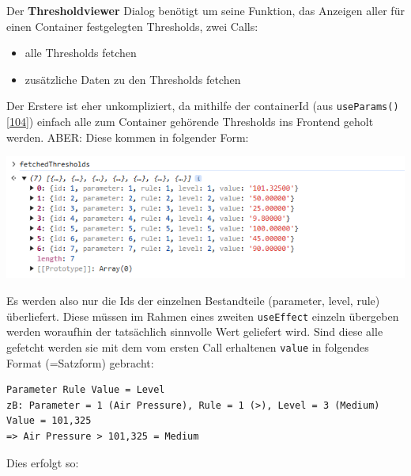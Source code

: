 \documentclass[
    headings=optiontotocandhead,%
    twoside,
    numbers=noenddot,%
    12pt, %
    titlepage, %
    parskip=full, %
    listof=leveldown, 
    numbers=noenddot, %
    a4paper,DIV=14,
    BCOR=15mm,
]{scrbook}
\newcommand{\passthrough}[1]{#1}
\let\origfigure=\figure
\let\endorigfigure=\endfigure
\renewenvironment{figure}[1][]{%
   \origfigure[H]
}{%
   \endorigfigure
}
\providecommand{\tightlist}{%
  \setlength{\itemsep}{0pt}\setlength{\parskip}{0pt}}
\begin{document}
Der \textbf{Thresholdviewer} Dialog benötigt um seine Funktion, das
Anzeigen aller für einen Container festgelegten Thresholds, zwei Calls:

\begin{itemize}
\tightlist
\item
  alle Thresholds fetchen
\item
  zusätzliche Daten zu den Thresholds fetchen
\end{itemize}

Der Erstere ist eher unkompliziert, da mithilfe der containerId (aus
\passthrough{\lstinline!useParams()!}
{[}\protect\hyperlink{ref-Refine-ReactRouter}{104}{]}) einfach alle zum
Container gehörende Thresholds ins Frontend geholt werden. ABER: Diese
kommen in folgender Form:

\begin{figure}
\centering
\includegraphics{img/Gekle/ThresholdsByBackend.png}
\caption{Form, in welcher die aus dem Backend gefetchten Thresholds sich
befinden}
\end{figure}

Es werden also nur die Ids der einzelnen Bestandteile (parameter, level,
rule) überliefert. Diese müssen im Rahmen eines zweiten
\passthrough{\lstinline!useEffect!} einzeln übergeben werden woraufhin
der tatsächlich sinnvolle Wert geliefert wird. Sind diese alle gefetcht
werden sie mit dem vom ersten Call erhaltenen
\passthrough{\lstinline!value!} in folgendes Format (=Satzform)
gebracht:

\begin{lstlisting}[caption={Verwandlung der Threshold Daten aus dem Backend in die Satzform}]
Parameter Rule Value = Level
zB: Parameter = 1 (Air Pressure), Rule = 1 (>), Level = 3 (Medium) Value = 101,325
=> Air Pressure > 101,325 = Medium
\end{lstlisting}

Dies erfolgt so:
\end{document}

